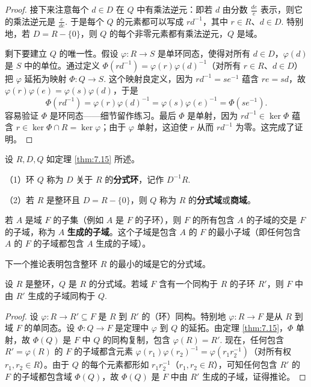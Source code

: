 \begin{proof}
接下来注意每个 \(d \in D\) 在 \(Q\) 中有乘法逆元：即若 \(d\) 由分数 \(\frac{de}{e}\) 表示，则它的乘法逆元是 \(\frac{e}{de}\). 于是每个 \(Q\) 的元素都可以写成 \(rd^{-1}\)，其中 \(r \in R\)、\(d \in D\). 特别地，若 \(D = R - \{0\}\)，则 \(Q\) 的每个非零元素都有乘法逆元，\(Q\) 是域。

剩下要建立 \(Q\) 的唯一性。假设 \(\varphi : R \to S\) 是单环同态，使得对所有 \(d \in D\)，\(\varphi(d)\) 是 \(S\) 中的单位。通过定义 \(\Phi(rd^{-1}) = \varphi(r)\varphi(d)^{-1}\)（对所有 \(r \in R\)、\(d \in D\)）把 \(\varphi\) 延拓为映射 \(\Phi : Q \to S\). 这个映射良定义，因为 \(rd^{-1} = se^{-1}\) 蕴含 \(re = sd\)，故 \(\varphi(r)\varphi(e) = \varphi(s)\varphi(d)\)，于是
\[
\Phi(rd^{-1}) = \varphi(r)\varphi(d)^{-1} = \varphi(s)\varphi(e)^{-1} = \Phi(se^{-1}).
\]
容易验证 \(\Phi\) 是环同态——细节留作练习。最后 \(\Phi\) 是单射，因为 \(rd^{-1} \in \ker\Phi\) 蕴含 \(r \in \ker\Phi \cap R = \ker\varphi\)；由于 \(\varphi\) 单射，这迫使 \(r\) 从而 \(rd^{-1}\) 为零。这完成了证明。
\end{proof}

\begin{definition}
设 \(R, D, Q\) 如定理 \ref{thm:7.15} 所述。

（1）环 \(Q\) 称为 \(D\) 关于 \(R\) 的\textbf{分式环}，记作 \(D^{-1}R\).

（2）若 \(R\) 是整环且 \(D = R - \{0\}\)，则 \(Q\) 称为 \(R\) 的\textbf{分式域}或\textbf{商域}。
\end{definition}

若 \(A\) 是域 \(F\) 的子集（例如 \(A\) 是 \(F\) 的子环），则 \(F\) 的所有包含 \(A\) 的子域的交是 \(F\) 的子域，称为 \(A\) \textbf{生成的子域}。这个子域是包含 \(A\) 的 \(F\) 的最小子域（即任何包含 \(A\) 的 \(F\) 的子域都包含 \(A\) 生成的子域）。

下一个推论表明包含整环 \(R\) 的最小的域是它的分式域。

\begin{corollary}\label{cor:7.16}
设 \(R\) 是整环，\(Q\) 是 \(R\) 的分式域。若域 \(F\) 含有一个同构于 \(R\) 的子环 \(R'\)，则 \(F\) 中由 \(R'\) 生成的子域同构于 \(Q\).
\end{corollary}

\begin{proof}
设 \(\varphi : R \to R' \subseteq F\) 是 \(R\) 到 \(R'\) 的（环）同构。特别地 \(\varphi : R \to F\) 是从 \(R\) 到域 \(F\) 的单同态。设 \(\Phi : Q \to F\) 是定理中 \(\varphi\) 到 \(Q\) 的延拓。由定理 \ref{thm:7.15}，\(\Phi\) 单射，故 \(\Phi(Q)\) 是 \(F\) 中 \(Q\) 的同构复制，包含 \(\varphi(R) = R'\). 现在，任何包含 \(R' = \varphi(R)\) 的 \(F\) 的子域都含元素 \(\varphi(r_1)\varphi(r_2)^{-1} = \varphi(r_1r_2^{-1})\)（对所有权 \(r_1, r_2 \in R\)）。由于 \(Q\) 的每个元素都形如 \(r_1r_2^{-1}\)（\(r_1, r_2 \in R\)），可知任何包含 \(R'\) 的 \(F\) 的子域都包含域 \(\Phi(Q)\)，故 \(\Phi(Q)\) 是 \(F\) 中由 \(R'\) 生成的子域，证得推论。
\end{proof}

